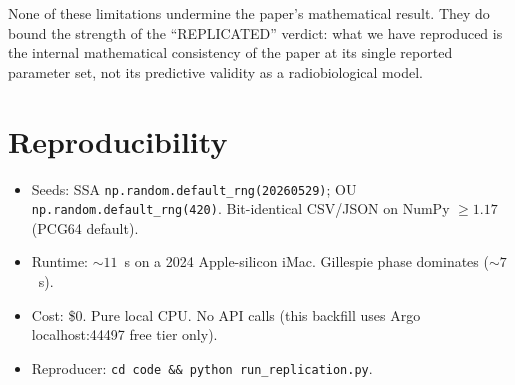 \documentclass[11pt]{article}
\begin{document}
\medskip
None of these limitations undermine the paper's mathematical result.  They do bound the strength of the ``REPLICATED'' verdict: what we have reproduced is the internal mathematical consistency of the paper at its single reported parameter set, not its predictive validity as a radiobiological model.



\section{Reproducibility}

\begin{itemize}
  \item Seeds: SSA \verb|np.random.default_rng(20260529)|; OU \verb|np.random.default_rng(420)|.  Bit-identical CSV/JSON on NumPy $\ge 1.17$ (PCG64 default).
  \item Runtime: $\sim 11$~s on a 2024 Apple-silicon iMac.  Gillespie phase dominates ($\sim 7$~s).
  \item Cost: \$0.  Pure local CPU.  No API calls (this backfill uses Argo localhost:44497 free tier only).
  \item Reproducer: \verb|cd code && python run_replication.py|.
\end{itemize}
\end{document}
